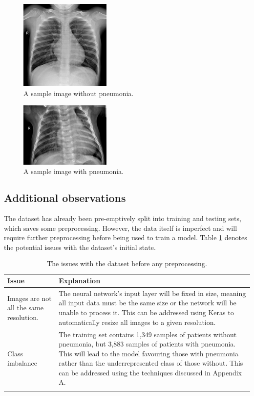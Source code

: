 \documentclass[12pt]{report}
\begin{document}
\begin{figure}[H]
    \centering
    \includegraphics[width=0.4\textwidth]{Proposal/SampleNORMAL.jpeg}
    \caption{A sample image without pneumonia.\label{fig:SampleNORMAL}}
\end{figure}

\begin{figure}[H]
    \centering
    \includegraphics[width=0.4\textwidth]{Proposal/SamplePNEUMONIA.jpeg}
    \caption{A sample image with pneumonia.\label{fig:SamplePNEUMONIA}}
\end{figure}


\subsection{Additional observations}
The dataset has already been pre-emptively split into training and testing sets, which saves some preprocessing. 
However, the data itself is imperfect and will require further preprocessing before being used to train a model. 
Table \ref{tab:DatasetIssues} denotes the potential issues with the dataset's initial state.

\begin{longtable}{ | p{} | p{} | }
    \hline
    \cellcolor{blue!25} Issue & \cellcolor{blue!25} Explanation \\
    \hline
    Images are not all the same resolution. & The neural network's input layer will be fixed in size, meaning all input data must be the 
    same size or the network will be unable to process it. This can be addressed using Keras to automatically resize all images to a given 
    resolution.\\
    \hline
    Class imbalance & The training set contains 1,349 samples of patients without pneumonia, but 3,883 samples of patients with pneumonia.
    This will lead to the model favouring those with pneumonia rather than the underrepresented class of those without. This can be addressed 
    using the techniques discussed in Appendix A.\\
    \hline
    \caption{The issues with the dataset before any preprocessing.}\label{tab:DatasetIssues}
\end{longtable}
\end{document}
